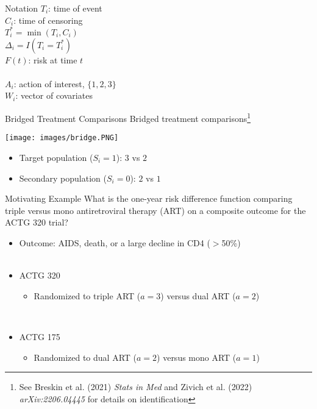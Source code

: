 \documentclass{beamer}
\begin{document}
\begin{frame}{Notation}
	$T_i$: time of event\\
	$C_i$: time of censoring\\
	$T^*_i = \min(T_i, C_i)$\\
	$\Delta_i = I(T_i = T_i^*)$\\
	$F(t)$: risk at time $t$\\~\\
	$A_i$: action of interest, $\{1,2,3\}$\\
	$W_i$: vector of covariates\\
\end{frame}

\begin{frame}{Bridged Treatment Comparisons}
	Bridged treatment comparisons\footnote[frame]{See Breskin et al. (2021) \textit{Stats in Med} and Zivich et al. (2022) \textit{arXiv:2206.04445} for details on identification}
	\begin{center}
		\texttt{[image: images/bridge.PNG]}
	\end{center}	
	\begin{itemize}
		\item Target population ($S_i=1$): $3$ vs $2$
		\item Secondary population ($S_i=0$): $2$ vs $1$
	\end{itemize}
\end{frame}

\begin{frame}{Motivating Example}
	What is the one-year risk difference function comparing triple versus mono antiretroviral therapy (ART) on a composite outcome for the ACTG 320 trial?
	\begin{itemize}
		\item Outcome: AIDS, death, or a large decline in CD4 ($>$50\%)\\~\\
		\item ACTG 320
		\begin{itemize}
			\item Randomized to triple ART ($a=3$) versus dual ART ($a=2$)
		\end{itemize}~\\
		\item ACTG 175
		\begin{itemize}
			\item Randomized to dual ART ($a=2$) versus mono ART ($a=1$)
		\end{itemize}
	\end{itemize}
\end{frame}
\end{document}

